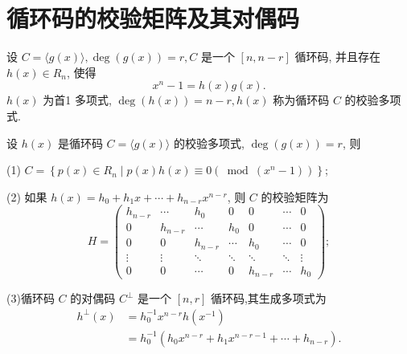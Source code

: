 \section{循环码的校验矩阵及其对偶码}
设 $ C=\langle g(x)\rangle, \operatorname{deg}(g(x))=r, C $ 是一个 $ [n, n-r] $ 循环码, 并且存在 $ h(x) \in R_{n} $, 使得
$$
x^{n}-1=h(x) g(x) .
$$
$ h(x) $ 为首1 多项式, $ \operatorname{deg}(h(x))=n-r, h(x) $ 称为循环码 $ C $ 的校验多项式.

\begin{theorem}\label{theorem9.3.1}
    设 $ h(x) $ 是循环码 $ C=\langle g(x)\rangle $ 的校验多项式, $ \operatorname{deg}(g(x))=r $, 则
    
(1) $ C=\left\{p(x) \in R_{n} \mid p(x) h(x) \equiv 0\left(\bmod \left(x^{n}-1\right)\right)\right\} $;

(2) 如果 $ h(x)=h_{0}+h_{1} x+\cdots+h_{n-r} x^{n-r} $, 则 $ C $ 的校验矩阵为
$$
H=\left(\begin{array}{ccccccc}
h_{n-r} & \cdots & h_{0} & 0 & 0 & \cdots & 0 \\
0 & h_{n-r} & \cdots & h_{0} & 0 & \cdots & 0 \\
0 & 0 & h_{n-r} & \cdots & h_{0} & \cdots & 0 \\
\vdots & \vdots & \ddots & \ddots & \ddots & \ddots & \vdots \\
0 & 0 & \cdots & 0 & h_{n-r} & \cdots & h_{0}
\end{array}\right) ;
$$

(3)循环码 $ C $ 的对偶码 $ C^{\perp} $ 是一个 $ [n, r] $ 循环码,其生成多项式为
$$
\begin{aligned}
h^{\perp}(x) & =h_{0}^{-1} x^{n-r} h\left(x^{-1}\right) \\
& =h_{0}^{-1}\left(h_{0} x^{n-r}+h_{1} x^{n-r-1}+\cdots+h_{n-r}\right) .
\end{aligned}
$$
\end{theorem}
